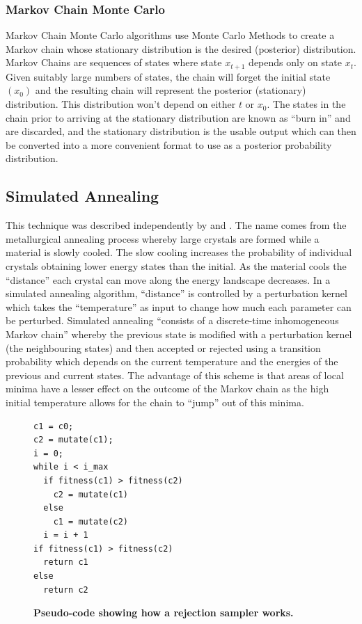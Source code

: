 \subsubsection*{Markov Chain Monte Carlo}

Markov Chain Monte Carlo algorithms use Monte Carlo Methods to create a Markov chain whose stationary distribution is the desired (posterior) distribution. Markov Chains are sequences of states where state $x_{t+1}$ depends only on state $x_t$. Given suitably large numbers of states, the chain will forget the initial state $(x_0)$ and the resulting chain will represent the posterior (stationary) distribution. This distribution won't depend on either $t$ or $x_0$\cite{Gilks1996}. The states in the chain prior to arriving at the stationary distribution are known as ``burn in'' and are discarded, and the stationary distribution is the usable output which can then be converted into a more convenient format to use as a posterior probability distribution.

\subsection{Simulated Annealing}

This technique was described independently by \citet{Kirkpatrick1983} and \citet{Cerny1985}. The name comes from the metallurgical annealing process whereby large crystals are formed while a material is slowly cooled. The slow cooling increases the probability of individual crystals obtaining lower energy states than the initial. As the material cools the ``distance'' each crystal can move along the energy landscape decreases. In a simulated annealing algorithm, ``distance'' is controlled by a perturbation kernel which takes the ``temperature'' as input to change how much each parameter can be perturbed.
Simulated annealing ``consists of a discrete-time inhomogeneous Markov chain''\cite{Bertsimas1993} whereby the previous state is modified with a perturbation kernel (the neighbouring states) and then accepted or rejected using a transition probability which depends on the current temperature and the energies of the previous and current states. The advantage of this scheme is that areas of local minima have a lesser effect on the outcome of the Markov chain as the high initial temperature allows for the chain to ``jump'' out of this minima.

\begin{figure}[tbp]
\small
\begin{verbatim}
c1 = c0;
c2 = mutate(c1);
i = 0;
while i < i_max
  if fitness(c1) > fitness(c2)
    c2 = mutate(c1)
  else
    c1 = mutate(c2)
  i = i + 1
if fitness(c1) > fitness(c2)
  return c1
else
  return c2
\end{verbatim}
\caption[Pseudo-code showing how a rejection sampler works.]{{\bf Pseudo-code showing how a rejection sampler works.}
\label{fig:sa_code}}
\end{figure}

